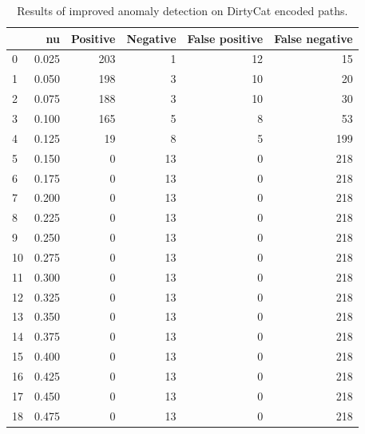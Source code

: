 \documentclass[a4paper,twoside,12pt]{book}
\begin{document}
\begin{appendices}
\begin{table}
	\centering
	\caption{Results of improved anomaly detection on DirtyCat encoded paths.}
	\label{id:tab:ocsvmOnDirtyCatGood}
	\begin{tabular}{lrrrrr}
		\toprule
		{} &     nu &  Positive &  Negative &  False positive &  False negative \\
		\midrule
		0  &  0.025 &       203 &         1 &              12 &              15 \\
		1  &  0.050 &       198 &         3 &              10 &              20 \\
		2  &  0.075 &       188 &         3 &              10 &              30 \\
		3  &  0.100 &       165 &         5 &               8 &              53 \\
		4  &  0.125 &        19 &         8 &               5 &             199 \\
		5  &  0.150 &         0 &        13 &               0 &             218 \\
		6  &  0.175 &         0 &        13 &               0 &             218 \\
		7  &  0.200 &         0 &        13 &               0 &             218 \\
		8  &  0.225 &         0 &        13 &               0 &             218 \\
		9  &  0.250 &         0 &        13 &               0 &             218 \\
		10 &  0.275 &         0 &        13 &               0 &             218 \\
		11 &  0.300 &         0 &        13 &               0 &             218 \\
		12 &  0.325 &         0 &        13 &               0 &             218 \\
		13 &  0.350 &         0 &        13 &               0 &             218 \\
		14 &  0.375 &         0 &        13 &               0 &             218 \\
		15 &  0.400 &         0 &        13 &               0 &             218 \\
		16 &  0.425 &         0 &        13 &               0 &             218 \\
		17 &  0.450 &         0 &        13 &               0 &             218 \\
		18 &  0.475 &         0 &        13 &               0 &             218 \\

\end{tabular}
\end{table}
\end{appendices}
\end{document}
